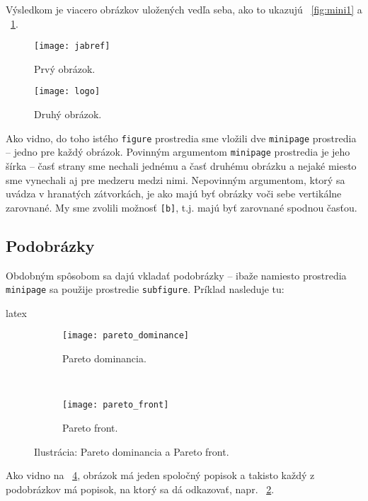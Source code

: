 Výsledkom je viacero obrázkov uložených vedľa seba, ako to ukazujú \figurename~\ref{fig:mini1} a \figurename~\ref{fig:mini2}.

\begin{figure}
\centering
\begin{minipage}[b]{0.58\textwidth}
\centering
\texttt{[image: jabref]}
\caption{Prvý obrázok.}
\label{fig:mini1}
\end{minipage}\quad
\begin{minipage}[b]{0.38\textwidth}
\centering
\texttt{[image: logo]}
\caption{Druhý obrázok.}
\label{fig:mini2}
\end{minipage}
\end{figure}

Ako vidno, do toho istého \texttt{figure} prostredia sme vložili dve \texttt{minipage} prostredia -- jedno pre každý obrázok. Povinným argumentom \texttt{minipage} prostredia je jeho šírka -- časť strany sme nechali jednému a časť druhému obrázku a nejaké miesto sme vynechali aj pre medzeru medzi nimi. Nepovinným argumentom, ktorý sa uvádza v hranatých zátvorkách, je ako majú byť obrázky voči sebe vertikálne zarovnané. My sme zvolili možnosť \texttt{[b]}, t.j. majú byť zarovnané spodnou časťou.

\subsection{Podobrázky}

Obdobným spôsobom sa dajú vkladať podobrázky -- ibaže namiesto prostredia \texttt{minipage} sa použije prostredie \texttt{subfigure}. Príklad nasleduje tu:
\begin{inlinecode}{latex}
\begin{figure}
\centering
\begin{subfigure}[c]{0.5\textwidth}
	\centering
	\texttt{[image: pareto\_dominance]}
	\caption{Pareto dominancia.}
	\label{fig:subfig1}
\end{subfigure}~
\begin{subfigure}[c]{0.5\textwidth}
	\centering
	\texttt{[image: pareto\_front]}
	\caption{Pareto front.}
	\label{fig:subfig2}
\end{subfigure}
\caption{Ilustrácia: Pareto dominancia a Pareto front.}
\label{fig:fig_with_subfigs}
\end{figure}
\end{inlinecode}

Ako vidno na \figurename~\ref{fig:fig_with_subfigs}, obrázok má jeden spoločný popisok a takisto každý z podobrázkov má popisok, na ktorý sa dá odkazovať, napr. \figurename~\ref{fig:subfig1}.

